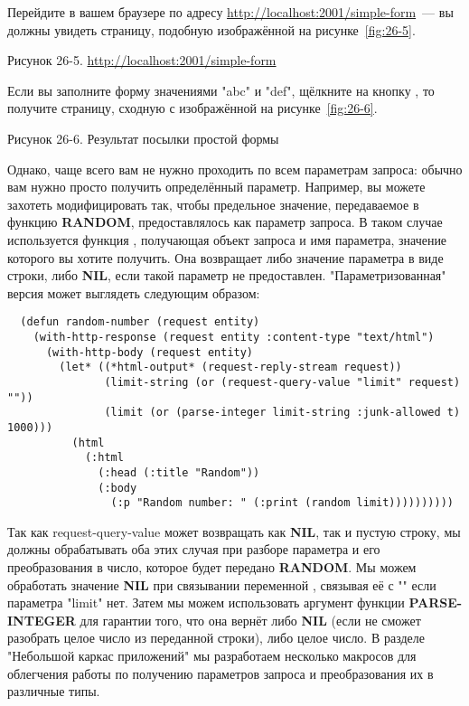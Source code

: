 Перейдите в вашем браузере по адресу \url{http://localhost:2001/simple-form}~--- вы должны
увидеть страницу, подобную изображённой на рисунке~\ref{fig:26-5}.

Рисунок 26-5. \url{http://localhost:2001/simple-form}

Если вы заполните форму значениями "abc" и "def", щёлкните на кнопку , то
получите страницу, сходную с изображённой на рисунке~\ref{fig:26-6}.

Рисунок 26-6. Результат посылки простой формы

Однако, чаще всего вам не нужно проходить по всем параметрам запроса: обычно вам нужно
просто получить определённый параметр. Например, вы можете захотеть модифицировать
 так, чтобы предельное значение, передаваемое в функцию
\textbf{RANDOM}, предоставлялось как параметр запроса. В таком случае используется функция
, получающая объект запроса и имя параметра, значение которого
вы хотите получить. Она возвращает либо значение параметра в виде строки, либо
\textbf{NIL}, если такой параметр не предоставлен. "Параметризованная" версия
 может выглядеть следующим образом:

\begin{lstlisting}
  (defun random-number (request entity)
    (with-http-response (request entity :content-type "text/html")
      (with-http-body (request entity)
        (let* ((*html-output* (request-reply-stream request))
               (limit-string (or (request-query-value "limit" request) ""))
               (limit (or (parse-integer limit-string :junk-allowed t) 1000)))
          (html
            (:html
              (:head (:title "Random"))
              (:body
                (:p "Random number: " (:print (random limit))))))))))
\end{lstlisting}

Так как request-query-value может возвращать как \textbf{NIL}, так и пустую строку, мы
должны обрабатывать оба этих случая при разборе параметра и его преобразования в число,
которое будет передано \textbf{RANDOM}. Мы можем обработать значение \textbf{NIL} при
связывании переменной , связывая её с "" если параметра "limit"
нет. Затем мы можем использовать аргумент функции \textbf{PARSE-INTEGER}
 для гарантии того, что она вернёт либо \textbf{NIL} (если не сможет
разобрать целое число из переданной строки), либо целое число. В разделе "Небольшой каркас
приложений" мы разработаем несколько макросов для облегчения работы по получению
параметров запроса и преобразования их в различные типы.

